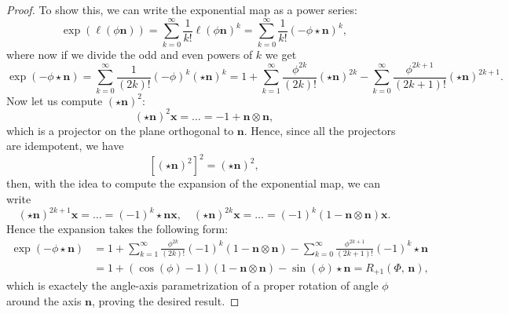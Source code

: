 \begin{proof}
    To show this, we can write the exponential map as a power series:
    \[
        \exp(\ell(\phi\mathbf{n})) = \sum_{k=0}^{\infty} \frac{1}{k!} \ell(\phi\mathbf{n})^k = \sum_{k=0}^{\infty} \frac{1}{k!} (-\phi \star \mathbf{n})^k,
    \]
    where now if we divide the odd and even powers of \(k\) we get
    \[
        \exp(-\phi \star \mathbf{n}) = \sum_{k=0}^{\infty} \frac{1}{(2k)!} (-\phi)^k (\star \mathbf{n})^{k} = 1 + \sum_{k=1}^{\infty} \frac{\phi^{2k}}{(2k)!} (\star \mathbf{n})^{2k} - \sum_{k=0}^{\infty} \frac{\phi^{2k+1}}{(2k+1)!} (\star \mathbf{n})^{2k+1}.
    \]
    Now let us compute \((\star \mathbf{n})^2\):
    \[
        (\star \mathbf{n})^2 \mathbf{x} = \dots = -1 + \mathbf{n} \otimes \mathbf{n},
    \]
    which is a projector on the plane orthogonal to \(\mathbf{n}\). Hence, since all the projectors are idempotent, we have
    \[
        \left[ (\star \mathbf{n})^2 \right]^2 = (\star \mathbf{n})^2,
    \]
    then, with the idea to compute the expansion of the exponential map, we can write
    \[
        (\star \mathbf{n})^{2k + 1}\mathbf{x} = \dots = (-1)^k \star \mathbf{n} \mathbf{x}, \quad (\star \mathbf{n})^{2k}\mathbf{x} = \dots = (-1)^k (1 - \mathbf{n} \otimes \mathbf{n}) \mathbf{x}.
    \]
    Hence the expansion takes the following form:
    \[
        \begin{aligned}
            \exp(-\phi \star \mathbf{n}) & = 1 + \sum_{k=1}^{\infty} \frac{\phi^{2k}}{(2k)!} (-1)^k (1 - \mathbf{n} \otimes \mathbf{n}) - \sum_{k=0}^{\infty} \frac{\phi^{2k+1}}{(2k+1)!} (-1)^k \star \mathbf{n} \\
                                         & = 1 + (\cos(\phi) - 1) (1 - \mathbf{n} \otimes \mathbf{n}) - \sin(\phi) \star \mathbf{n} = R_{+1}(\Phi,\,\mathbf{n}),
        \end{aligned}
    \]
    which is exactely the angle-axis parametrization of a proper rotation of angle \(\phi\) around the axis \(\mathbf{n}\), proving the desired result.
\end{proof}